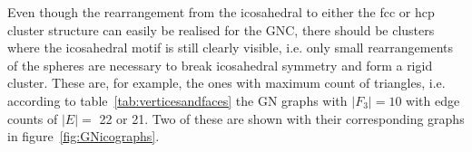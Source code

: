 Even though the rearrangement from the icosahedral to either the \ac{fcc} or
\ac{hcp} cluster structure can easily be realised for the GNC, there should be
clusters where the icosahedral motif is still clearly visible, i.e. only small
rearrangements of the spheres are necessary to break icosahedral symmetry and
form a rigid cluster. These are, for example, the ones with maximum count of
triangles, i.e. according to table~\ref{tab:verticesandfaces} the GN graphs with
$|F_3|=10$ with edge counts of $|E|=$ 22 or 21. Two of these are shown with
their corresponding graphs in figure~\ref{fig:GNicographs}.
%
\begin{figure}[htb]
    \centering
    \\

\end{figure}
